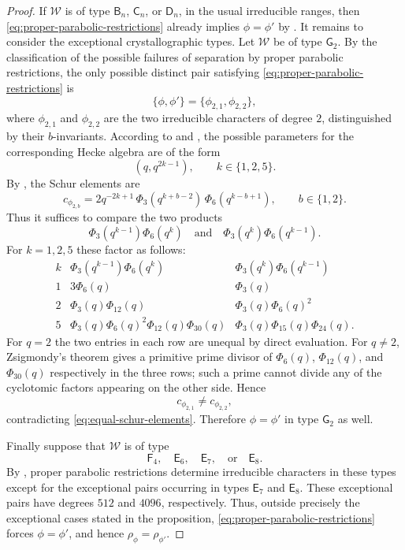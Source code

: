 \documentclass{amsart}
\theoremstyle{plain}
\numberwithin{equation}{section}
\theoremstyle{definition}
\newcommand{\cW}{\mathcal{W}}
\begin{document}
\begin{proof}
If $\cW$ is of type $\mathsf B_n$, $\mathsf C_n$, or $\mathsf D_n$, in the
usual irreducible ranges, then \eqref{eq:proper-parabolic-restrictions}
already implies $\phi=\phi'$ by
\cite[Thm.~6.2.9]{geck-pfeiffer:2000:characters-of-finite-coxeter-groups}.
It remains to consider the exceptional crystallographic types.  Let $\cW$ be
of type $\mathsf G_2$.  By the classification of the possible failures of
separation by proper parabolic restrictions, the only possible distinct pair
satisfying \eqref{eq:proper-parabolic-restrictions} is
\[
\{\phi,\phi'\}=\{\phi_{2,1},\phi_{2,2}\},
\]
where $\phi_{2,1}$ and $\phi_{2,2}$ are the two irreducible characters of
degree $2$, distinguished by their $b$-invariants.  According to
\cite[Table~II]{Lus84} and \cite[Thm.~8.6]{Lus84}, the possible parameters for
the corresponding Hecke algebra are of the form
\[
(q,q^{2k-1}),\qquad k\in\{1,2,5\}.
\]
By \cite[Thm.~8.3.4]{geck-pfeiffer:2000:characters-of-finite-coxeter-groups},
the Schur elements are
\[
c_{\phi_{2,b}}
=
2q^{-2k+1}\,
\Phi_3(q^{k+b-2})\,
\Phi_6(q^{k-b+1}),
\qquad b\in\{1,2\}.
\]
Thus it suffices to compare the two products
\[
\Phi_3(q^{k-1})\Phi_6(q^k)
\quad\text{and}\quad
\Phi_3(q^k)\Phi_6(q^{k-1}).
\]
For $k=1,2,5$ these factor as follows:
\[
\begin{array}{c|c|c}
k &
\Phi_3(q^{k-1})\Phi_6(q^k) &
\Phi_3(q^k)\Phi_6(q^{k-1}) \\
\hline
1 &
3\Phi_6(q) &
\Phi_3(q) \\
2 &
\Phi_3(q)\Phi_{12}(q) &
\Phi_3(q)\Phi_6(q)^2 \\
5 &
\Phi_3(q)\Phi_6(q)^2\Phi_{12}(q)\Phi_{30}(q) &
\Phi_3(q)\Phi_{15}(q)\Phi_{24}(q).
\end{array}
\]
For $q=2$ the two entries in each row are unequal by direct evaluation.  For
$q\neq 2$, Zsigmondy's theorem gives a primitive prime divisor of
$\Phi_6(q)$, $\Phi_{12}(q)$, and $\Phi_{30}(q)$ respectively in the three
rows; such a prime cannot divide any of the cyclotomic factors appearing on
the other side.  Hence
\[
c_{\phi_{2,1}}\neq c_{\phi_{2,2}},
\]
contradicting \eqref{eq:equal-schur-elements}.  Therefore $\phi=\phi'$ in
type $\mathsf G_2$ as well.

Finally suppose that $\cW$ is of type
\[
\mathsf F_4,\quad \mathsf E_6,\quad \mathsf E_7,\quad \text{or}\quad
\mathsf E_8.
\]
By \cite[6.3.6]{geck-pfeiffer:2000:characters-of-finite-coxeter-groups},
proper parabolic restrictions determine irreducible characters in these types
except for the exceptional pairs occurring in types $\mathsf E_7$ and
$\mathsf E_8$.  These exceptional pairs have degrees $512$ and $4096$,
respectively.  Thus, outside precisely the exceptional cases stated in the
proposition, \eqref{eq:proper-parabolic-restrictions} forces
$\phi=\phi'$, and hence $\rho_{\phi}=\rho_{\phi'}$.
\end{proof}
\end{document}
